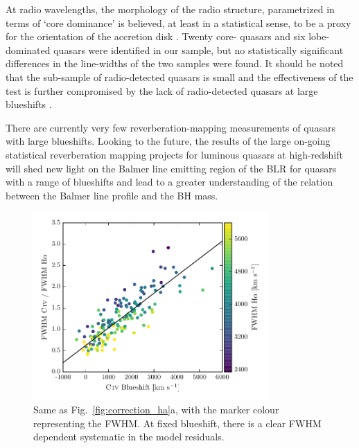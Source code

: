 At radio wavelengths, the morphology of the radio structure, parametrized in terms of `core dominance' is believed, at least in a statistical sense, to be a proxy for the orientation of the accretion disk \citep[e.g.][]{jackson91}.
Twenty core- quasars and six lobe-dominated quasars were identified in our sample, but no statistically significant differences in the \ha line-widths of the two samples were found. 
It should be noted that the sub-sample of radio-detected quasars is small and the effectiveness of the test is further compromised by the lack of radio-detected quasars at large blueshifts \citep[see figure 14 of][for example]{richards11}.


There are currently very few reverberation-mapping measurements of quasars with large  blueshifts.
Looking to the future, the results of the large on-going statistical reverberation mapping projects \citep[e.g.][]{shen15,kingoz15} for luminous quasars at high-redshift will shed new light on the Balmer line emitting region of the BLR for quasars with a range of  blueshifts and lead to a greater understanding of the relation between the Balmer line profile and the BH mass. 

\begin{figure}
    \centering 
    \includegraphics[width=0.8\textwidth]{figures/chapter03/fwhm_correction_color.pdf}  
    \caption[{Same as Fig.~\ref{fig:correction_ha}a, with the marker colour representing the \ha FWHM.}]{Same as Fig.~\ref{fig:correction_ha}a, with the marker colour representing the \ha FWHM. At fixed  blueshift, there is a clear \ha FWHM dependent systematic in the model residuals.}   
    \label{fig:residuals_ha_fwhm}
\end{figure}

